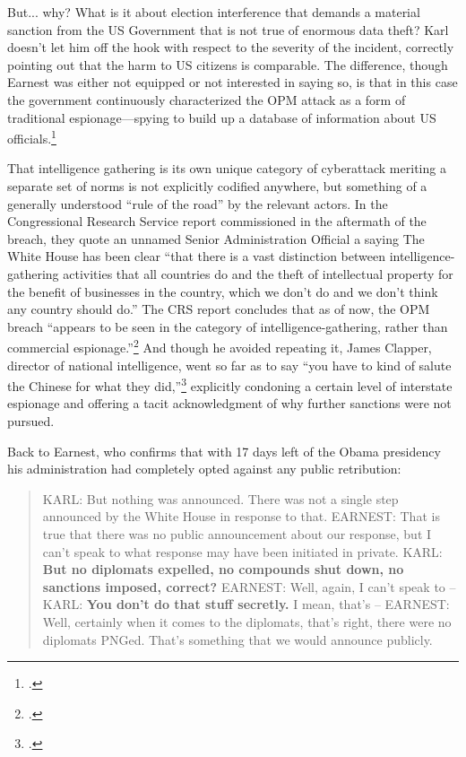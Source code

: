 \documentclass[12pt]{article}
\begin{document}
But... why? What is it about election interference that demands a material sanction from the US Government that is not true of enormous data theft? Karl doesn't let him off the hook with respect to the severity of the incident, correctly pointing out that the harm to US citizens is comparable. The difference, though Earnest was either not equipped or not interested in saying so, is that in this case the government continuously characterized the OPM attack as a form of traditional espionage---spying to build up a database of information about US officials.\footcite{nakashima_chinese_2015} 

That intelligence gathering is its own unique category of cyberattack meriting a separate set of norms is not explicitly codified anywhere, but something of a generally understood ``rule of the road'' by the relevant actors. In the Congressional Research Service report commissioned in the aftermath of the breach, they quote an unnamed Senior Administration Official a saying The White House has been clear ``that there is a vast distinction between intelligence-gathering activities that all countries do and the theft of intellectual property for the benefit of businesses in the country, which we don’t do and we don’t think any country should do.'' The CRS report concludes that as of now, the OPM breach ``appears to be seen in the category of intelligence-gathering, rather than commercial espionage.''\footcite{finklea_cyber_2015} And though he avoided repeating it, James Clapper, director of national intelligence, went so far as to say ``you have to kind of salute the Chinese for what they did,''\footcite{sanger_u.s._2015} explicitly condoning a certain level of interstate espionage and offering a tacit acknowledgment of why further sanctions were not pursued.

Back to Earnest, who confirms that with 17 days left of the Obama presidency his administration had completely opted against any public retribution:

\begin{quote}
KARL: But nothing was announced. There was not a single step announced by the White House in response to that.
\newline \newline
EARNEST: That is true that there was no public announcement about our response, but I can't speak to what response may have been initiated in private.
\newline \newline
KARL: \textbf{But no diplomats expelled, no compounds shut down, no sanctions imposed, correct?}
\newline \newline
EARNEST: Well, again, I can't speak to --
\newline \newline
KARL: \textbf{You don't do that stuff secretly.}  I mean, that's --
\newline \newline
EARNEST: Well, certainly when it comes to the diplomats, that's right, there were no diplomats PNGed. That's something that we would announce publicly.
\end{quote}
\end{document}
